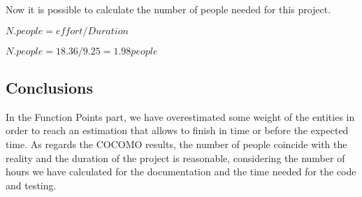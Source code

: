 		\vspace{0.5cm}
		Now it is possible to calculate	the number of people needed for this project.
		\vspace{0.5cm}
		\begin{center}
			\begin{math}
				N. people = effort / Duration
			\end{math}
		\end{center}
		\begin{center}
			\begin{math}
				N. people = 18.36 / 9.25 = 1.98 people
			\end{math}
		\end{center}
		\vspace{0.5cm}
	\subsection{Conclusions}
		In the Function Points part, we have overestimated some weight of the entities in order to reach an estimation that allows to finish in time or before the expected time. As regards the COCOMO results, the number of people coincide with the reality and the duration of the project is reasonable, considering the number of hours we have calculated for the documentation and the time needed for the code and testing.